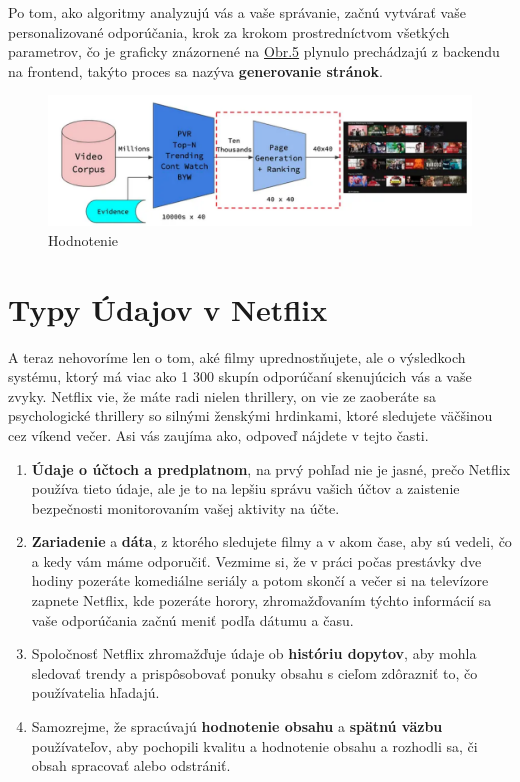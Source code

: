 \documentclass[10pt,slovak,a4paper]{article}
\begin{document}
Po tom, ako algoritmy analyzujú vás a vaše správanie, začnú vytvárať vaše personalizované odporúčania, krok za krokom prostredníctvom všetkých parametrov, čo je graficky znázornené na  \hyperref[Ranking]{Obr.5} plynulo prechádzajú z backendu na frontend, takýto proces sa nazýva \textbf{generovanie stránok}.

\begin{figure}[h!]
  \centering
  \label{Ranking}
  \includegraphics[width=1\textwidth]{Images_tables/Ranking.pdf}
  \caption{Hodnotenie}
\end{figure}

\section{Typy Údajov v Netflix}
A teraz nehovoríme len o tom, aké filmy uprednostňujete, ale o výsledkoch systému, ktorý má viac ako 1 300 skupín odporúčaní skenujúcich vás a vaše zvyky. Netflix vie, že máte radi nielen thrillery, on vie ze zaoberáte sa psychologické thrillery so silnými ženskými hrdinkami, ktoré sledujete väčšinou cez víkend večer. Asi vás zaujíma ako, odpoveď nájdete v tejto časti.

\begin{enumerate}
    \item \textbf{Údaje o účtoch a predplatnom}, na prvý pohľad nie je jasné, prečo Netflix používa tieto údaje, ale je to na lepšiu správu vašich účtov a zaistenie bezpečnosti monitorovaním vašej aktivity na účte.

    \item \textbf{Zariadenie} a \textbf{dáta}, z ktorého sledujete filmy a v akom čase, aby sú vedeli, čo a kedy vám máme odporučiť.\cite{Data} Vezmime si, že v práci počas prestávky dve hodiny pozeráte komediálne seriály a potom skončí a večer si na televízore zapnete Netflix, kde pozeráte horory, zhromažďovaním týchto informácií sa vaše odporúčania začnú meniť podľa dátumu a času.

    \item Spoločnosť Netflix zhromažďuje údaje ob  \textbf{históriu dopytov}, aby mohla sledovať trendy a prispôsobovať ponuky obsahu s cieľom zdôrazniť to, čo používatelia hľadajú.

    \item Samozrejme, že spracúvajú \textbf{hodnotenie obsahu} a \textbf{spätnú väzbu} používateľov, aby pochopili kvalitu a hodnotenie obsahu a rozhodli sa, či obsah spracovať alebo odstrániť.
    
\end{enumerate}
\end{document}

